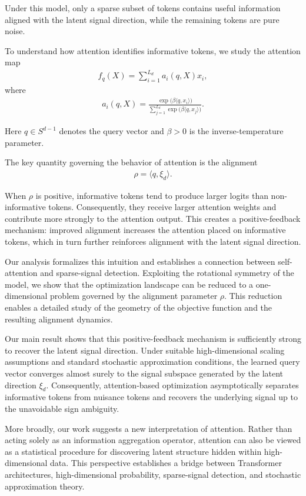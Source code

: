 \documentclass[11pt,a4paper]{article}
\theoremstyle{definition}
\begin{document}
Under this model, only a sparse subset of tokens contains useful information aligned with the latent signal direction, while the remaining tokens are pure noise.

To understand how attention identifies informative tokens, we study the attention map
\begin{align}
f_q(X)
=
\sum_{i=1}^{L_d}
a_i(q,X)x_i,
\end{align}
where
\begin{align}
a_i(q,X)
=
\frac{\exp\!\bigl(\beta\langle q,x_i\rangle\bigr)}
{\sum_{j=1}^{L_d}
\exp\!\bigl(\beta\langle q,x_j\rangle\bigr)}.
\end{align}

Here $q\in S^{d-1}$ denotes the query vector and $\beta>0$ is the inverse-temperature parameter.

The key quantity governing the behavior of attention is the alignment
\begin{align}
\rho
=
\langle q,\xi_d\rangle.
\end{align}

When $\rho$ is positive, informative tokens tend to produce larger logits than non-informative tokens. Consequently, they receive larger attention weights and contribute more strongly to the attention output. This creates a positive-feedback mechanism: improved alignment increases the attention placed on informative tokens, which in turn further reinforces alignment with the latent signal direction.

Our analysis formalizes this intuition and establishes a connection between self-attention and sparse-signal detection. Exploiting the rotational symmetry of the model, we show that the optimization landscape can be reduced to a one-dimensional problem governed by the alignment parameter $\rho$. This reduction enables a detailed study of the geometry of the objective function and the resulting alignment dynamics.

Our main result shows that this positive-feedback mechanism is sufficiently strong to recover the latent signal direction. Under suitable high-dimensional scaling assumptions and standard stochastic approximation conditions, the learned query vector converges almost surely to the signal subspace generated by the latent direction $\xi_d$. Consequently, attention-based optimization asymptotically separates informative tokens from nuisance tokens and recovers the underlying signal up to the unavoidable sign ambiguity.

More broadly, our work suggests a new interpretation of attention. Rather than acting solely as an information aggregation operator, attention can also be viewed as a statistical procedure for discovering latent structure hidden within high-dimensional data. This perspective establishes a bridge between Transformer architectures, high-dimensional probability, sparse-signal detection, and stochastic approximation theory.
\end{document}
